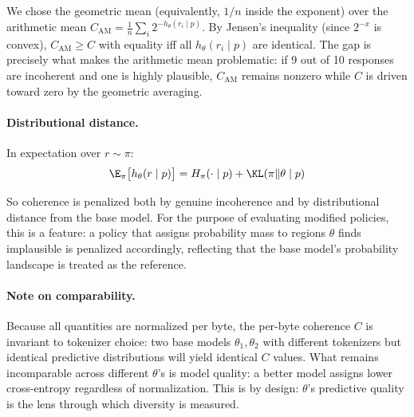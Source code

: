 We chose the geometric mean (equivalently, $1/n$ inside the exponent) over the arithmetic mean $C_{\mathrm{AM}} = \frac{1}{n}\sum_i 2^{-h_\theta(r_i \mid p)}$.
By Jensen's inequality (since $2^{-x}$ is convex), $C_{\mathrm{AM}} \geq C$ with equality iff all $h_\theta(r_i \mid p)$ are identical.
The gap is precisely what makes the arithmetic mean problematic: if 9 out of 10 responses are incoherent and one is highly plausible, $C_{\mathrm{AM}}$ remains nonzero while $C$ is driven toward zero by the geometric averaging.

\paragraph{Distributional distance.} In expectation over $r \sim \pi$:
\begin{equation}
    \E_\pi\bigl[h_\theta(r \mid p)\bigr] = H_\pi(\cdot \mid p) + \KL(\pi \| \theta \mid p)
\end{equation}

So coherence is penalized both by genuine incoherence and by distributional distance from the base model.
For the purpose of evaluating modified policies, this is a feature: a policy that assigns probability mass to regions $\theta$ finds implausible is penalized accordingly, reflecting that the base model's probability landscape is treated as the reference.

\paragraph{Note on comparability.} Because all quantities are normalized per byte, the per-byte coherence $C$ is invariant to tokenizer choice: two base models $\theta_1, \theta_2$ with different tokenizers but identical predictive distributions will yield identical $C$ values.
What remains incomparable across different $\theta$'s is model quality: a better model assigns lower cross-entropy regardless of normalization.
This is by design: $\theta$'s predictive quality is the lens through which diversity is measured.

